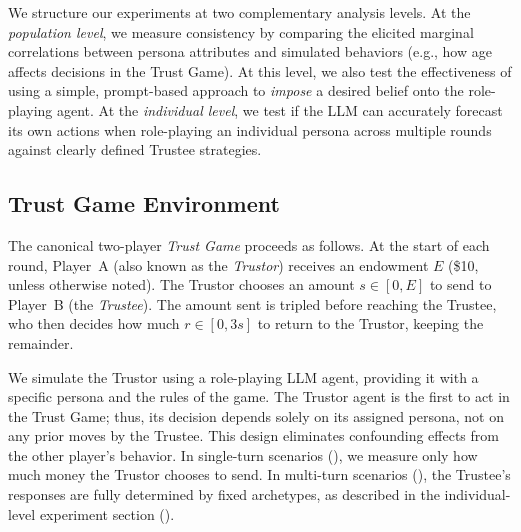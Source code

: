 \documentclass{article} %
\begin{document}
We structure our experiments at two complementary analysis levels. At the \emph{population level}, we measure consistency by comparing the elicited marginal correlations between persona attributes and simulated behaviors (e.g., how age affects decisions in the Trust Game). At this level, we also test the effectiveness of using a simple, prompt-based approach to \textit{impose} a desired belief onto the role-playing agent. At the \emph{individual level}, we test if the LLM can accurately forecast its own actions when role-playing an individual persona across multiple rounds against clearly defined Trustee strategies. 

\subsection{Trust Game Environment}
\label{subsec:simulation_framework}

The canonical two-player \textit{Trust Game} proceeds as follows. At the start of each round, Player~A (also known as the \emph{Trustor}) receives an endowment $E$ (\$10, unless otherwise noted). The Trustor chooses an amount $s\in[0,E]$ to send to Player~B (the \emph{Trustee}). The amount sent is tripled before reaching the Trustee, who then decides how much $r\in[0,3s]$ to return to the Trustor, keeping the remainder.

We simulate the Trustor using a role-playing LLM agent, providing it with a specific persona and the rules of the game. The Trustor agent is the first to act in the Trust Game; thus, its decision depends solely on its assigned persona, not on any prior moves by the Trustee. This design eliminates confounding effects from the other player's behavior. In single-turn scenarios (), we measure only how much money the Trustor chooses to send. In multi-turn scenarios (), the Trustee's responses are fully determined by fixed archetypes, as described in the individual-level experiment section ().
\end{document}
